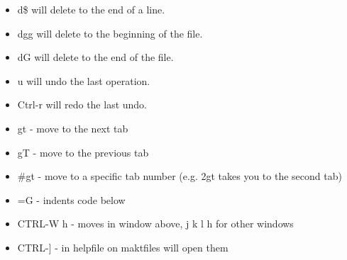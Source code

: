 \documentclass[12pt]{article}
\begin{document}
\begin{itemize}
    \item d\$ will delete to the end of a line.
    \item dgg will delete to the beginning of the file.
    \item dG will delete to the end of the file.
    \item u will undo the last operation.
    \item Ctrl-r will redo the last undo. \\
    \item gt - move to the next tab
    \item gT - move to the previous tab
    \item \#gt - move to a specific tab number (e.g. 2gt takes you to the second tab)
    \item =G - indents code below
    \item CTRL-W h - moves in window above, j k l h for other windows
    \item CTRL-] - in helpfile on maktfiles will open them
\end{itemize}
\end{document}
